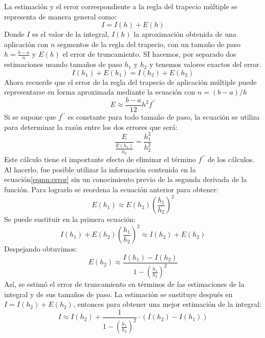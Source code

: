 La estimación y el error correspondiente a la regla del trapecio múltiple se representa de manera general como:
\begin{equation}
    I=I(h)+E(h)
\end{equation}
Donde $I$ es el valor de la integral, $I(h)$ la aproximación obtenida de una aplicación con $n$ segmentos de la regla del trapecio, con un tamaño de paso $h=\frac{b-a}{n}$ y $E(h)$ el error de truncamiento. SI hacemos, por separado dos estimaciones usando tamaños de paso $h_1$ y $h_2$ y tenemos valores exactos del error.
\begin{equation}
    I(h_1)+E(h_1)= I(h_2)+E(h_2)
\end{equation}
Ahora recuerde que el error de la regla del trapecio de aplicación múltiple puede representarse en forma aproximada mediante la ecuación con $n=(b-a)/h$
\begin{equation}
    E \approx \frac{b-a}{12}h^2f^{\prime\prime}
    \label{eqmn:error}
\end{equation}
Si se supone que $f^{\prime\prime}$ es constante para todo tamaño de paso, la ecuación se utiliza para determinar la razón entre los dos errores que será:
\begin{equation}
    \frac{E}{\frac{E(h_1)}{h_2}} =\frac{h_1^2}{h_2^2}
\end{equation}
Este cálculo tiene el importante efecto de eliminar el término $f^{\prime\prime}$ de los cálculos. Al hacerlo, fue posible utilizar la información contenida en la ecuación\eqref{eqmn:error} sin un conocimiento previo de la segunda derivada de la función. Para lograrlo se reordena la ecuación anterior para obtener:
\begin{equation}
    E(h_1) \approx E(h_2)\left(\frac{h_1}{h_2}\right)^2
\end{equation}
Se puede sustituir en la primera ecuación:
\begin{equation*}
    I(h_1) + E(h_2)\left(\frac{h_1}{h_2}\right)^2\approx I(h_2) + E(h_2)
\end{equation*}
Despejando obtuvimos:
\begin{equation}
    E(h_2) \approx \frac{I(h_1) -I(h_2)}{1 -\left(\frac{h_1}{h_2}\right)^2}
\end{equation}
Así, se estimó el error de truncamiento en términos de las estimaciones de la integral y de sus tamaños de paso. La estimación se sustituye después en $I=I(h_2)+E(h_2)$, entonces para obtener una mejor estimación de la integral:
\begin{equation}
    I \approx I(h_2) + \frac{1}{1 -\left(\frac{h_1}{h_2}\right)^2}\cdot\left(I(h_2) - I(h_1)\right)
\end{equation}
